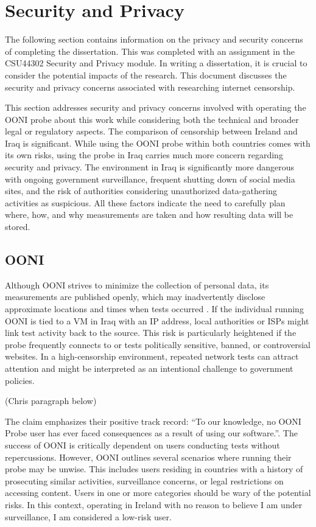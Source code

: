 \chapter{Security and Privacy}

The following section contains information on the privacy and security
concerns of completing the dissertation. This was completed with an assignment in the CSU44302 Security and Privacy module. In writing a dissertation, it is crucial to consider the potential impacts of the research. This document discusses the security and privacy concerns associated with researching internet censorship.

This section addresses security and privacy concerns involved with operating the OONI probe about this work while considering both the technical and broader legal or regulatory aspects. The comparison of censorship between Ireland and Iraq is significant. While using the OONI probe within both countries comes with its own risks, using the probe in Iraq carries much more concern regarding security and privacy. The environment in Iraq is significantly more dangerous with ongoing government surveillance, frequent shutting down of social media sites, and the risk of authorities considering unauthorized data-gathering activities as suspicious. All these factors indicate the need to carefully plan where, how, and why measurements are taken and how resulting data will be stored.

\section{OONI}

Although OONI strives to minimize the collection of personal data, its measurements are published openly, which may inadvertently disclose approximate locations and times when tests occurred \cite{ooniOONIPrivacyAndSecurity}. If the individual running OONI is tied to a VM in Iraq with an IP address, local authorities or ISPs might link test activity back to the source. This risk is particularly heightened if the probe frequently connects to or tests politically sensitive, banned, or controversial websites. In a high-censorship environment, repeated network tests can attract attention and might be interpreted as an intentional challenge to government policies.

(Chris paragraph below)

The claim emphasizes their positive track record: “To our knowledge, no OONI Probe user has ever faced consequences as a result of using our software.”\cite{OONIRisks}. The success of OONI is critically dependent on users conducting tests without repercussions. However, OONI outlines several scenarios where running their probe may be unwise. This includes users residing in countries with a history of prosecuting similar activities, surveillance concerns, or legal restrictions on accessing content. Users in one or more categories should be wary of the potential
risks. In this context, operating in Ireland with no reason to believe I am under surveillance, I am considered a low-risk user.

